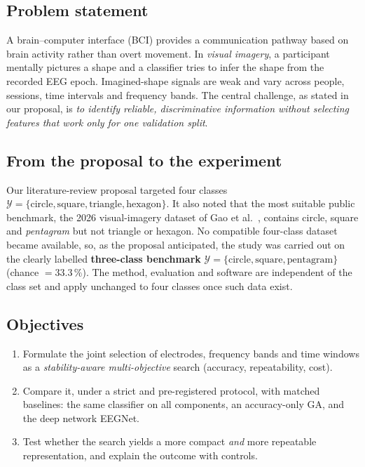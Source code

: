 \documentclass[11pt,a4paper]{article}
\begin{document}
\subsection{Problem statement}
A brain--computer interface (BCI) provides a communication pathway based on brain activity rather than
overt movement. In \emph{visual imagery}, a participant mentally pictures a shape and a classifier tries
to infer the shape from the recorded EEG epoch. Imagined-shape signals are weak and vary across people,
sessions, time intervals and frequency bands. The central challenge, as stated in our proposal, is
\emph{to identify reliable, discriminative information without selecting features that work only for
one validation split}.

\subsection{From the proposal to the experiment}
Our literature-review proposal targeted four classes $\mathcal{Y}=\{\text{circle},\text{square},
\text{triangle},\text{hexagon}\}$. It also noted that the most suitable public benchmark, the 2026
visual-imagery dataset of Gao et al.~\cite{gao2026}, contains circle, square and \emph{pentagram}
but not triangle or hexagon. No compatible four-class dataset became available, so, as the proposal
anticipated, the study was carried out on the clearly labelled \textbf{three-class benchmark}
$\mathcal{Y}=\{\text{circle},\text{square},\text{pentagram}\}$ (chance $=33.3\,\%$). The method,
evaluation and software are independent of the class set and apply unchanged to four classes once such
data exist.

\subsection{Objectives}
\begin{enumerate}
  \item Formulate the joint selection of electrodes, frequency bands and time windows as a
        \emph{stability-aware multi-objective} search (accuracy, repeatability, cost).
  \item Compare it, under a strict and pre-registered protocol, with matched baselines: the same
        classifier on all components, an accuracy-only GA, and the deep network EEGNet.
  \item Test whether the search yields a more compact \emph{and} more repeatable representation, and
        explain the outcome with controls.
\end{enumerate}
\end{document}
